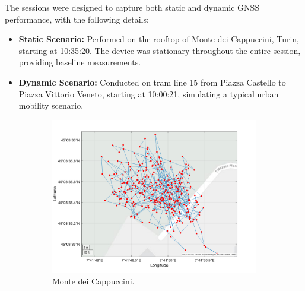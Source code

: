         The sessions were designed to capture both static and dynamic GNSS performance, with the following details:

        \begin{itemize}
            \item \textbf{Static Scenario:} Performed on the rooftop of Monte dei Cappuccini, Turin, starting at 10:35:20. The device was stationary throughout the entire session, providing baseline measurements.
            \item \textbf{Dynamic Scenario:} Conducted on tram line 15 from Piazza Castello to Piazza Vittorio Veneto, starting at 10:00:21, simulating a typical urban mobility scenario.
        \end{itemize}

        \begin{figure}[h!]
          \centering
          \begin{subfigure}{0.23\textwidth}
              \centering
              \includegraphics[width=\textwidth]{images/Monte_Cappuccini/filtered/Samsung_A51_Monte_Cappuccini_fig6.png}
              \caption{Monte dei Cappuccini.}
              \label{fig:static_scenario}
          \end{subfigure}
          \hfill
          \begin{subfigure}{0.23\textwidth}
              \centering

\end{subfigure}
\end{figure}
